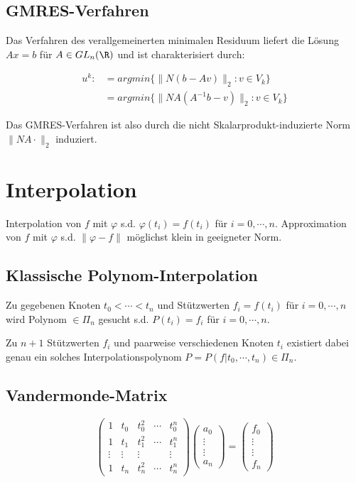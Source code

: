 \subsection*{GMRES-Verfahren}

Das Verfahren des verallgemeinerten minimalen Residuum liefert die Lösung $Ax=b$ für $A \in GL_n(\R)$ und ist charakterisiert durch:

\vspace{-4mm}
\begin{align*}
	u^k :&= argmin\{\|N(b-Av)\|_2 : v \in V_k\} \\
	     &= argmin\{\|NA(A^{-1}b-v)\|_2 : v \in V_k\}
\end{align*}

Das GMRES-Verfahren ist also durch die nicht Skalarprodukt-induzierte  Norm $\|NA\cdot\|_2$ induziert.

\section*{Interpolation}

Interpolation von $f$ mit $\varphi$ s.d. $\varphi(t_i) = f(t_i)$ für $i = 0,\cdots, n$. Approximation von $f$ mit $\varphi$ s.d. $\|\varphi - f\|$ möglichst klein in geeigneter Norm.

\subsection*{Klassische Polynom-Interpolation}

Zu gegebenen Knoten $t_0 < \cdots < t_n$ und Stützwerten $f_i = f(t_i)$ für $i = 0,\cdots,n$ wird Polynom $ \in \Pi_n$ gesucht s.d. $P(t_i)=f_i$ für $i = 0,\cdots,n$.

Zu $n+1$ Stützwerten $f_i$ und paarweise verschiedenen Knoten $t_i$ existiert dabei genau ein solches Interpolationspolynom $P=P(f|t_0,\cdots,t_n) \in \Pi_n$.

\subsection*{Vandermonde-Matrix}

$$\begin{pmatrix}
1      & t_0    & t_0^2  & \cdots & t_0^n  \\
1      & t_1    & t_1^2  & \cdots & t_1^n  \\
\vdots & \vdots & \vdots &        & \vdots \\
1      & t_n    & t_n^2  & \cdots & t_n^n
\end{pmatrix}
\begin{pmatrix}a_0 \\ \vdots \\ \vdots \\ a_n\end{pmatrix} =
\begin{pmatrix}f_0 \\ \vdots \\ \vdots \\ f_n\end{pmatrix}$$

